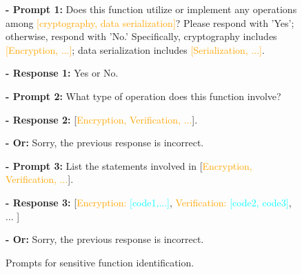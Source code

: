 \begin{figure}[ht]
  \centering
\begin{tcolorbox}[colframe=gray!50!white, 
 colback=white, 
 coltitle=black, 
 fonttitle=\bfseries, 
 left=1mm, 
 right=1mm]

\footnotesize
\textbf{- \textcolor{green!60!black}{Prompt 1:}}  Does this function utilize or implement any operations among \textcolor{orange}{[cryptography, data serialization]}? Please respond with 'Yes'; otherwise, respond with 'No.' Specifically, cryptography includes \textcolor{orange}{[Encryption, ...]}; data serialization includes \textcolor{orange}{[Serialization, ...]}.

\textbf{- \textcolor{red!80!black}{Response 1:}} Yes or No.

\medskip

\textbf{- \textcolor{green!60!black}{Prompt 2:}} What type of operation does this function involve?

\textbf{- \textcolor{red!80!black}{Response 2:}} [\textcolor{orange}{Encryption, Verification, ...}]. 

\textbf{- \textcolor{red!80!black}{Or:}} Sorry, the previous response is incorrect. 

\medskip

\textbf{- \textcolor{green!60!black}{Prompt 3:}} List the statements involved in [\textcolor{orange}{Encryption, Verification, ...}].

\textbf{- \textcolor{red!80!black}{Response 3:}}
[\textcolor{orange}{Encryption: \textcolor{cyan}{[code1,...]}},
\textcolor{orange}{Verification: \textcolor{cyan}{[code2, 
code3]}},
...
]

\textbf{- \textcolor{red!80!black}{Or:}} Sorry, the previous response is incorrect.

\end{tcolorbox}
\caption{Prompts for sensitive function identification.}
\label{box:sen_prompt}
\end{figure}